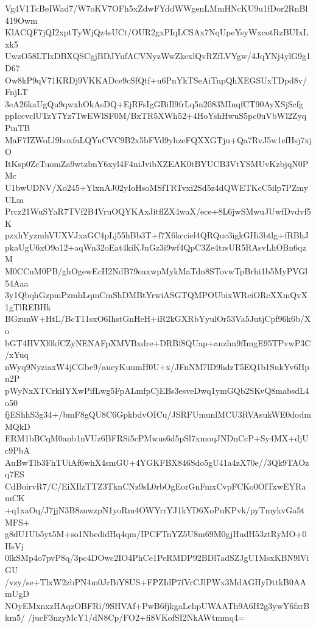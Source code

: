 Vg4V1TcBeIWad7/W7oKV7OFh5xZdwFYddWWgenLMmHNcKU9u1fDor2RnBl419Owm
KlACQF7jQI2xptTyWjQz4sUCt/OUR2gxPIqLCSAx7NqUpeYsyWxcotRzBUIxLxk5
UwzO58LTlxDBXQSCgjBDJYufACVNyzWwZkexlQvRZfLVYgw/4JqYNj4ylG9g1D67
Ow8kP9qV71KRDj9VKKADce9cSfQtf+u6PnYkTSeAiTnpQhXEGSUxTDpd8v/FnjLT
3eA26kaUgQu9qwxhOkAsDQ+EjRFsIgGBiIl9frLq5n2083MInqfCT90AyXSjScfg
ppIccvclUTzY7Yz7TwEWlSF0M/BxTR5XWh52+4HoYshHwuS5pc0uVbWl2ZyqPmTB
MaF7IZWoLl9hoxfaLQYuCVC9B2x5bFVd9yhzeFQXXGTju+Qa7RvJ5w1efHsj7xjO
ItKsp0ZcTuomZa9wtzbnY6xyl4F4niJvibXZEAK0tBYUCB3VtYSMUvKzbjqN0PMc
U1bwUDNV/Xo245+YlxnAJ02yIoHsoMSfTRTvxi2Sd5z4dQWETKcC5ilp7PZmyULm
Prcz21WuSYaR7TVf2B4VruOQYKAxJitflZX4waX/ece+8L6jwSMwuJUwfDvdvf5K
pzxhYyzmhVUXVJxaGC4pLj55hBb3T+f7X6kcciel4QRQuc3igkGHi3btlg+fRBhJ
pkaUgU6xO9o12+aqWn32oEat4kiKJnGz3i9wf4QpC3Ze4trsUR5RAsvLhOBn6qzM
M0CCnM0PB/ghOgewEcH2NdB79eaxwpMykMaTdn8STovwTpBrhi1b5MyPVGl54Aaa
3y1QbqhGzpmPzmhLqmCmShDMBtYrwiASGTQMPOUbixWReiOReXXmQvX1gTlREBHk
BGzunW+HtL/BcT11sxO6IhstGnHeH+iR2kGXRbYyulOr53Va5JutjCpf96k6b/Xo
bGT4HVXl0kfCZyNENAFpXMVBxdre+DRBf8QUap+auzhn9fImgE95TPvwP3C/xYuq
nWyq9NyziaxW4jCGbe9/aueyKuumH0U+x/JFnNM7lD9hdzT5EQ1b1SukYv6Hpn2P
pWyNxXTCrkiIYXwPifLwg5FpALmfpCjEBs3esveDwq1ymGQb2SKvQ8mabsdL4o50
fjEShhS3g34+/bmF8gQU8C6GpkbdvOICu/JSRFUmunlMCU3RVAsukWE0dodmMQkD
ERM1bBCqM0anb1nVUz6BFRSi5cPMwus6d5pSl7xmoqJNDnCcP+Sy4MX+djUc9PbA
AuBwTlb3FhTUiAf6whX4smGU+4YGKFBX846Sdo5gU41a4zX70e//3Qk9TAOzq7ES
CdBoirvR7/C/EiXIlzTTZ3TknCNz9sL0rbOgEorGnFmxCvpFCKo0OlTxwEYRamCK
+q1xaOq/J7jjN3B8zuwzpN1yoRm4OWYrrYJ1kYD6XoPuKPvk/pyTmykvGa5tMFS+
g8dU1Ub5yt5M+so1NbedidHq4qm/IPCFTnYZ5U8m69M0gjHudH53ztRyMO+0HsVj
0lkSMp4o7pvP8q/3pc4DOwc2IO4PhCe1PeRMDP92BDl7adSZJgU1MsxKBN9lViGU
/vzy/se+TlxW2zbPN4m0JrBiY8US+FPZIdP7fVrCJlPWx3MdAGHyDttkB0AAmUgD
NOyEMxnxzHAqzOBFRi/9SHVAf+PwB6fjkgaLehpUWAATh9A6H2g3ywY6fzrBkm5/
/jucF3nzyMcY1/dN8Cp/FO2+fi8VKofSI2NkAWtmmq4=
